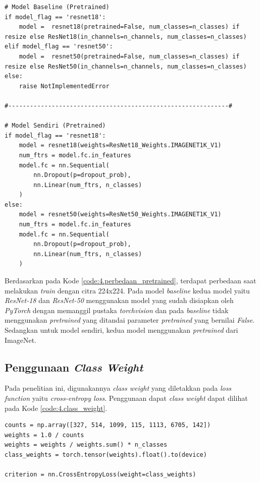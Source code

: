 \begin{lstlisting}[caption={Perbedaan Model \textit{Pretrained}}, label={code:4.perbedaan_pretrained}]
# Model Baseline (Pretrained)
if model_flag == 'resnet18':
    model =  resnet18(pretrained=False, num_classes=n_classes) if resize else ResNet18(in_channels=n_channels, num_classes=n_classes)
elif model_flag == 'resnet50':
    model =  resnet50(pretrained=False, num_classes=n_classes) if resize else ResNet50(in_channels=n_channels, num_classes=n_classes)
else:
    raise NotImplementedError

#-------------------------------------------------------------#

# Model Sendiri (Pretrained)
if model_flag == 'resnet18':
    model = resnet18(weights=ResNet18_Weights.IMAGENET1K_V1)
    num_ftrs = model.fc.in_features
    model.fc = nn.Sequential(
        nn.Dropout(p=dropout_prob),
        nn.Linear(num_ftrs, n_classes)
    )
else:
    model = resnet50(weights=ResNet50_Weights.IMAGENET1K_V1)
    num_ftrs = model.fc.in_features
    model.fc = nn.Sequential(
        nn.Dropout(p=dropout_prob),
        nn.Linear(num_ftrs, n_classes)
    )
\end{lstlisting}

Berdasarkan pada Kode \ref{code:4.perbedaan_pretrained}, terdapat perbedaan 
saat melakukan \textit{train} dengan citra 224x224. Pada model 
\textit{baseline} kedua model yaitu \textit{ResNet-18} dan \textit{ResNet-50} 
menggunakan model yang sudah disiapkan oleh \textit{PyTorch} dengan 
memanggil pustaka \textit{torchvision} dan pada \textit{baseline} tidak 
menggunakan \textit{pretrained} yang ditandai parameter \textit{pretrained} 
yang bernilai \textit{False}. Sedangkan untuk model sendiri, kedua model 
menggunakan \textit{pretrained} dari ImageNet.


\subsection{Penggunaan \textit{Class Weight}} \label{IV.Penggunaan_Class_Weight}
Pada penelitian ini, digunakannya \textit{class weight} yang diletakkan 
pada \textit{loss function} yaitu \textit{cross-entropy loss}. Penggunaan 
dapat \textit{class weight} dapat dilihat pada Kode \ref{code:4.class_weight}. \par

\begin{lstlisting}[caption={Penggunaan \textit{Class Weight}}, label={code:4.class_weight}]
counts = np.array([327, 514, 1099, 115, 1113, 6705, 142])
weights = 1.0 / counts
weights = weights / weights.sum() * n_classes 
class_weights = torch.tensor(weights).float().to(device)

criterion = nn.CrossEntropyLoss(weight=class_weights)
\end{lstlisting}

